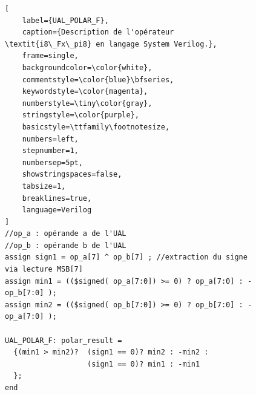 \documentclass[../main.tex]{subfiles}
\begin{document}
\begin{figure}[!tb]
\begin{lstlisting}[
    label={UAL_POLAR_F},
    caption={Description de l'opérateur \textit{i8\_Fx\_pi8} en langage System Verilog.},
    frame=single,
    backgroundcolor=\color{white},  
    commentstyle=\color{blue}\bfseries,
    keywordstyle=\color{magenta},
    numberstyle=\tiny\color{gray},
    stringstyle=\color{purple},
    basicstyle=\ttfamily\footnotesize,
    numbers=left,
    stepnumber=1,
    numbersep=5pt,                 
    showstringspaces=false,
    tabsize=1,
    breaklines=true,
    language=Verilog
]
//op_a : opérande a de l'UAL 
//op_b : opérande b de l'UAL
assign sign1 = op_a[7] ^ op_b[7] ; //extraction du signe via lecture MSB[7]
assign min1 = (($signed( op_a[7:0]) >= 0) ? op_a[7:0] : -op_b[7:0] );
assign min2 = (($signed( op_b[7:0]) >= 0) ? op_b[7:0] : -op_a[7:0] );

UAL_POLAR_F: polar_result = 
  {(min1 > min2)?  (sign1 == 0)? min2 : -min2 : 
                   (sign1 == 0)? min1 : -min1
  };
end
\end{lstlisting}
\end{figure}
\end{document}
